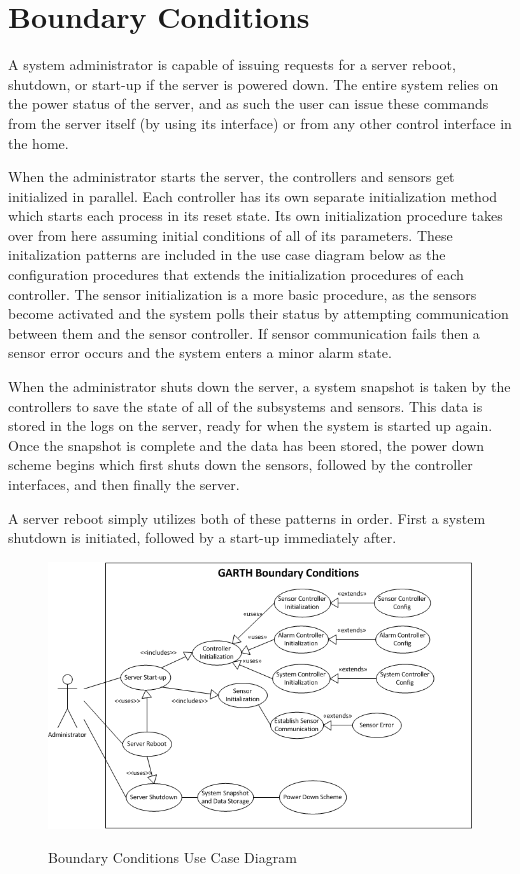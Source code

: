 \documentclass{report}
\begin{document}
\section{Boundary Conditions}

A system administrator is capable of issuing requests for a server reboot,
shutdown, or start-up if the server is powered down. The entire system relies
on the power status of the server, and as such the user can issue these
commands from the server itself (by using its interface) or from any other
control interface in the home.

When the administrator starts the server, the controllers and sensors get
initialized in parallel. Each controller has its own separate initialization
method which starts each process in its reset state. Its own initialization
procedure takes over from here assuming initial conditions of all of its
parameters. These initalization patterns are included in the use case diagram
below as the configuration procedures that extends the initialization
procedures of each controller. The sensor initialization is a more basic
procedure, as the sensors become activated and the system polls their status by
attempting communication between them and the sensor controller. If sensor
communication fails then a sensor error occurs and the system enters a minor
alarm state.

When the administrator shuts down the server, a system snapshot is taken by the
controllers to save the state of all of the subsystems and sensors. This data
is stored in the logs on the server, ready for when the system is started up
again. Once the snapshot is complete and the data has been stored, the power
down scheme begins which first shuts down the sensors, followed by the
controller interfaces, and then finally the server.

A server reboot simply utilizes both of these patterns in order. First a system
shutdown is initiated, followed by a start-up immediately after.

\begin{figure}[hp]
    \centering
        \caption{Boundary Conditions Use Case Diagram}
        \scriptsize
        \setlength{\unitlength}{2.0em}
        \includegraphics{boundary_conditions.png}
        \normalsize
    \label{fig:boundary_conditions}
\end{figure}
\end{document}
